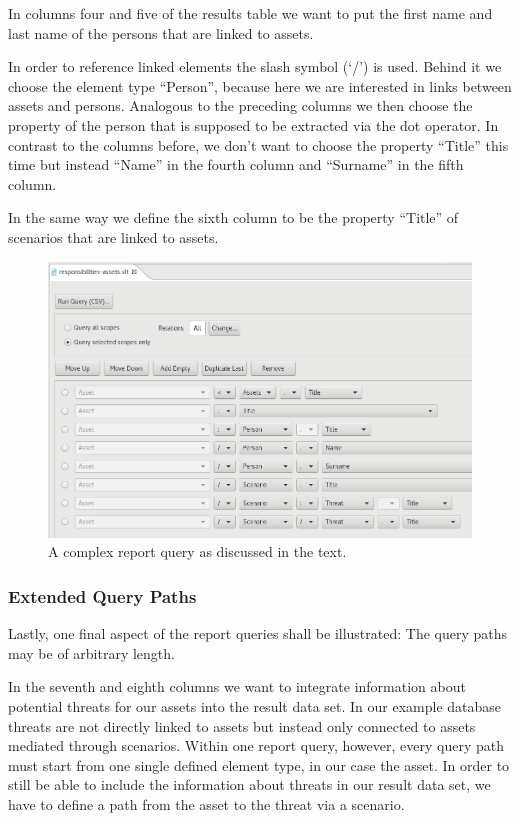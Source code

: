 \documentclass[a4paper,10pt]{book}
\begin{document}
In columns four and five of the results table we want to put the first name and
last name of the persons that are linked to assets.

In order to reference linked elements the slash symbol (`/') is used. Behind it
we choose the element type ``Person'', because here we are interested in links
between assets and persons. Analogous to the preceding columns we then choose
the property of the person that is supposed to be extracted via the dot
operator. In contrast to the columns before, we don't want to choose the
property ``Title'' this time but instead ``Name'' in the fourth column and
``Surname'' in the fifth column.

In the same way we define the sixth column to be the property ``Title'' of
scenarios that are linked to assets.

\begin{figure}[htb!]
  \centering
  \includegraphics[width=\linewidth]{Screenshot/query-editor-complex-en.png}
  \caption{A complex report query as discussed in the text.}
  \label{fig:complex-report-query}
\end{figure}

\subsubsection{Extended Query Paths}\label{extended-query-paths}

Lastly, one final aspect of the report queries shall be illustrated: The query
paths may be of arbitrary length.

In the seventh and eighth columns we want to integrate information about
potential threats for our assets into the result data set. In our example
database threats are not directly linked to assets but instead only connected to
assets mediated through scenarios. Within one report query, however, every query
path must start from one single defined element type, in our case the asset. In
order to still be able to include the information about threats in our result
data set, we have to define a path from the asset to the threat via a scenario.
\end{document}
